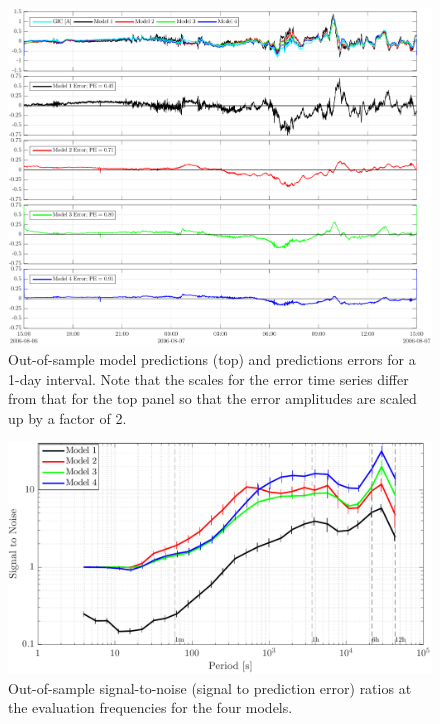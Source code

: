 \documentclass[draft,linenumbers]{agujournal2018}
\begin{document}
\begin{figure}[h]
\centering
\includegraphics[width=\textwidth]{figures/plot_model_predictions-MeanModel-2006-08-06.pdf}
\caption{Out-of-sample model predictions (top) and predictions errors for a 1-day interval. Note that the scales for the error time series differ from that for the top panel so that the error amplitudes are scaled up by a factor of 2.}
\label{predictions}
\end{figure}

\begin{figure}[h]
\centering
\includegraphics[width=\textwidth]{figures/plot_model_summary_SN-options-1.pdf}
\caption{Out-of-sample signal-to-noise (signal to prediction error) ratios at the evaluation frequencies for the four models.}
\label{SN}
\end{figure}
\end{document}

